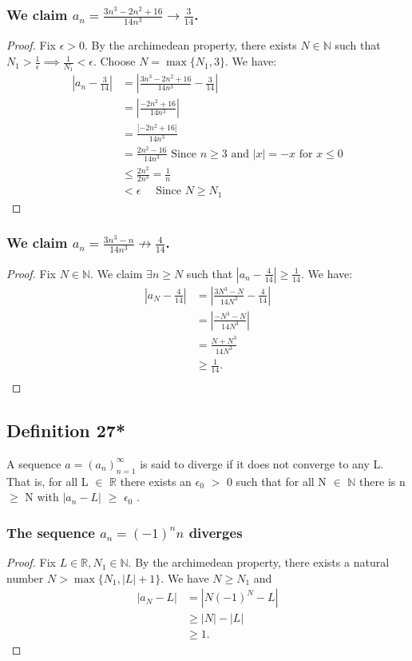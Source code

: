 \documentclass{article}
\begin{document}
\subsubsection{We claim $a_n = \frac{3n^3-2n^2+16}{14n^3} \rightarrow \frac{3}{14}$.}
\begin{proof}
Fix $\epsilon>0$. By the archimedean property, there exists $N \in \mathbb{N}$ such that $N_1>\frac{1}{\epsilon} \implies \frac{1}{N_1}<\epsilon$. Choose $N=\max \{N_1, 3 \}$. We have:
\begin{align*}
\left |  a_n-\frac{3}{14} \right | &= \left | \frac{3n^3-2n^2+16}{14n^3}-\frac{3}{14} \right | \\
&= \left | \frac{-2n^2+16}{14n^3} \right | \\
&= \frac{|-2n^2+16|}{14n^3} \\
&= \frac{2n^2-16}{14n^3} \text{ Since $n \geq 3$ and $|x|=-x$ for $x \leq 0$} \\
&\leq \frac{2n^2}{2n^3} = \frac{1}{n} \\
&< \epsilon \quad \text{ Since $N \geq N_1$}
\end{align*}
\end{proof}
\subsubsection{We claim $a_n = \frac{3n^3-n}{14n^3} \not \rightarrow \frac{4}{14}$.}
\begin{proof}
Fix $N\in\mathbb{N}$. We claim $\exists n \geq N$ such that $|a_n-\frac{4}{14}|\geq\frac{1}{14}$. We have:
\begin{align*}
\left |  a_N-\frac{4}{14} \right | &= \left | \frac{3N^3-N}{14N^3}-\frac{4}{14} \right | \\
&= \left | \frac{-N^3-N}{14N^3} \right | \\
&= \frac{N+N^3}{14N^3} \\
&\geq \frac{1}{14}. \\
\end{align*}
\end{proof}
\subsection{Definition 27*}
A sequence $a = (a_n)^{\infty}_{n=1}$ is said to diverge if it does not converge to any
L. That is, for all L $\in$ $\mathbb{R}$ there exists an $\epsilon_0$ $>$ 0 such that for all N $\in$ $\mathbb{N}$ there is n $\geq$ N with
$|a_n - L|$ $\geq$ $\epsilon_0$ .
\subsubsection{The sequence $a_n = (-1)^n n$ diverges}
\begin{proof}
Fix $L \in \mathbb{R}, N_1 \in \mathbb{N}$. By the archimedean property, there exists a natural number
$N > \max \{ N_1, |L|+1 \}$.
 We have $N \geq N_1$ and
\begin{align*}
\left |  a_N-L \right | &= \left |N(-1)^N-L \right | \\
&\geq \left |N \right | - \left | L \right |\\
&\geq 1.
\end{align*}
\end{proof}
\end{document}
